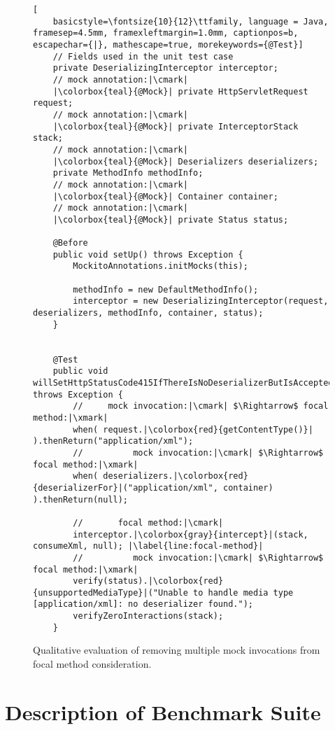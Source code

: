 \begin{figure}[p]
	\begin{lstlisting}[
	basicstyle=\fontsize{10}{12}\ttfamily, language = Java, framesep=4.5mm, framexleftmargin=1.0mm, captionpos=b, escapechar={|}, mathescape=true, morekeywords={@Test}]
	// Fields used in the unit test case
	private DeserializingInterceptor interceptor;
	// mock annotation:|\cmark|
	|\colorbox{teal}{@Mock}| private HttpServletRequest request;
	// mock annotation:|\cmark|
	|\colorbox{teal}{@Mock}| private InterceptorStack stack;
	// mock annotation:|\cmark|
	|\colorbox{teal}{@Mock}| Deserializers deserializers;
	private MethodInfo methodInfo;
	// mock annotation:|\cmark|
	|\colorbox{teal}{@Mock}| Container container;
	// mock annotation:|\cmark|
	|\colorbox{teal}{@Mock}| private Status status;
	
	@Before
	public void setUp() throws Exception {
		MockitoAnnotations.initMocks(this);
		
		methodInfo = new DefaultMethodInfo();
		interceptor = new DeserializingInterceptor(request, deserializers, methodInfo, container, status);
	}
	
	
	@Test
	public void willSetHttpStatusCode415IfThereIsNoDeserializerButIsAccepted() throws Exception {
		//     mock invocation:|\cmark| $\Rightarrow$ focal method:|\xmark|
		when( request.|\colorbox{red}{getContentType()}| ).thenReturn("application/xml");
		//     		mock invocation:|\cmark| $\Rightarrow$ focal method:|\xmark|
		when( deserializers.|\colorbox{red}{deserializerFor}|("application/xml", container) ).thenReturn(null);
		
		//       focal method:|\cmark|
		interceptor.|\colorbox{gray}{intercept}|(stack, consumeXml, null); |\label{line:focal-method}|
		//     		mock invocation:|\cmark| $\Rightarrow$ focal method:|\xmark|
		verify(status).|\colorbox{red}{unsupportedMediaType}|("Unable to handle media type [application/xml]: no deserializer found.");
		verifyZeroInteractions(stack);
	}
	\end{lstlisting}
	
	\caption{Qualitative evaluation of removing multiple mock invocations from focal method consideration.}
	\label{fig:mockExample2Evaluation}
\end{figure}

\section{Description of Benchmark Suite}

